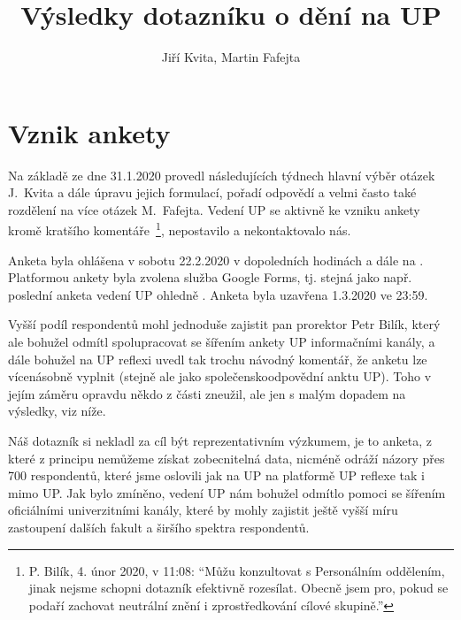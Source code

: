 \documentclass[a4paper,twoside]{article}
\author{Jiří Kvita, Martin Fafejta}
\title{Výsledky dotazníku o dění na UP}
\begin{document}
\maketitle

\tableofcontents
\newpage

\section{Vznik ankety}

Na základě  ze dne 31.1.2020 provedl následujících týdnech hlavní výběr otázek J.~Kvita a dále úpravu jejich formulací, pořadí odpovědí a velmi často také rozdělení na více otázek M.~Fafejta. Vedení UP se aktivně ke vzniku ankety kromě kratšího komentáře~\footnote{P. Bilík, 4. únor 2020, v 11:08: ``Můžu konzultovat s Personálním oddělením, jinak nejsme schopni dotazník efektivně rozesílat. Obecně jsem pro, pokud se podaří zachovat neutrální znění i zprostředkování cílové skupině.''}, nepostavilo a nekontaktovalo nás.

Anketa byla ohlášena v sobotu 22.2.2020  v dopoledních hodinách  a dále na . Platformou ankety byla zvolena služba Google Forms, tj. stejná jako např. poslední anketa vedení UP ohledně . Anketa byla uzavřena 1.3.2020 ve 23:59.

Vyšší podíl respondentů mohl jednoduše zajistit pan prorektor Petr Bilík, který ale bohužel odmítl spolupracovat se šířením ankety UP informačními kanály, a dále bohužel na UP reflexi uvedl tak trochu návodný komentář, že anketu lze vícenásobně vyplnit (stejně ale jako společenskoodpovědní anktu UP). Toho v jejím záměru opravdu někdo z části zneužil, ale jen s malým dopadem na výsledky, viz níže.

Náš dotazník si nekladl za cíl být reprezentativním výzkumem, je to anketa, z které z principu nemůžeme získat zobecnitelná data, nicméně odráží názory přes 700 respondentů, které jsme oslovili jak na UP na platformě UP reflexe tak i mimo UP. Jak bylo zmíněno, vedení UP nám bohužel odmítlo pomoci se šířením oficiálními univerzitními kanály, které by mohly zajistit ještě vyšší míru zastoupení dalších fakult a širšího spektra respondentů.
\end{document}
